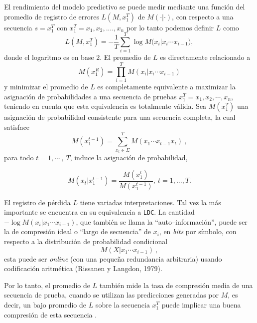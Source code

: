 El rendimiento del modelo predictivo se puede medir mediante una función del promedio de registro de errores $L(M,x_{1}^{T})$ de $M (\cdot | \cdot )$, con respecto a una secuencia $s = x_{1}^{T}$ con $x_{1}^{T}= x_{1},x_{2},....,x_{n} $ %
  por lo tanto podemos definir $L$ como \begin{equation} L( M , x_{1}^{T} ) = 
- \dfrac{1}{T} 
\sum _{i=1}^{T} \log{ M(x_{i} | x_{i} \cdots x_{i-1}} ),\end{equation}
donde el logaritmo es en base $2$.  El promedio de $L$ es directamente relacionado a  \begin{equation}M(x_{1}^{R}) = \prod_{i=1}^{T} M(x_{i} | x_{i} \cdots x_{i-1} ) \end{equation} y minimizar el promedio de $L$ es completamente equivalente a maximizar la asignación de probabilidades a una secuencia de pruebas $x_{1}^{T}= x_{1},x_{2},\cdots,x_{n} $, teniendo en cuenta que esta equivalencia es totalmente válida. 
Sea $M(x_{1}^{T})$ una asignación de probabilidad consistente para una secuencia completa, la cual satisface \begin{equation}
M(x_{1}^{t-1}) = \sum_{\mbox{$x_t$} \in \Sigma}^{T} M(x_{1} \cdots x_{t-1}x_{t} ) \ , 
\end{equation}para todo $t=1,\cdots\ ,\ T$, induce la asignación de probabilidad,

\begin{equation}
M(x_{t} | x_{1}^{t-1} ) =  \dfrac{M(x_{1}^{t})}{M(x_{1}^{t-1} )},\ t=1,...,T.
\end{equation}


El registro de pérdida $L$ tiene variadas interpretaciones. Tal vez la más importante se encuentra en su equivalencia a \texttt{LDC}. La cantidad $-\log M (x_{i} | x_{1} \cdots x_{i-1}) $, que también se llama la ``auto--información'', puede ser la de compresión ideal o ``largo de secuencia'' de $x_{i}$, en \emph{bits} por símbolo, con respecto a la distribución de probabilidad condicional  \begin{equation}M (X | x_{1} \cdots x_{i-1}) \ ,\end{equation} esta puede ser  \emph{online} (con  una pequeña redundancia arbitraria) usando codificación aritmética (Rissanen y Langdon, 1979)\cite{RissanenLangdon1979}.


Por lo tanto, el promedio de $L$ también mide la tasa de compresión media de una secuencia de prueba, cuando se utilizan las predicciones generadas por $M$, es decir, un bajo promedio de $L$ %
sobre la secuencia $x_{1}^{T}$ puede implicar una buena compresión de esta secuencia \cite{Begleiter2004}.

